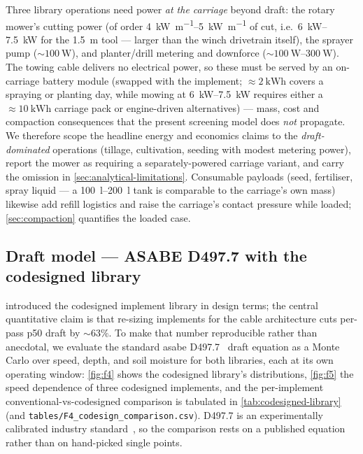 \documentclass[11pt,a4paper]{article}
\begin{document}
Three library operations need power \emph{at the carriage} beyond draft: the rotary mower's cutting power (of order \SIrange{4}{5}{\kilo\watt\per\meter} of cut, i.e.\ \SIrange{6}{7.5}{\kilo\watt} for the \SI{1.5}{\meter} tool --- larger than the winch drivetrain itself), the sprayer pump (${\sim}\SI{100}{\watt}$), and planter/drill metering and downforce (${\sim}\SIrange{100}{300}{\watt}$). The towing cable delivers no electrical power, so these must be served by an on-carriage battery module (swapped with the implement; ${\approx}\SI{2}{\kWh}$ covers a spraying or planting day, while mowing at \SIrange{6}{7.5}{\kilo\watt} requires either a ${\approx}\SI{10}{\kWh}$ carriage pack or engine-driven alternatives) --- mass, cost and compaction consequences that the present screening model does \emph{not} propagate. We therefore scope the headline energy and economics claims to the \emph{draft-dominated} operations (tillage, cultivation, seeding with modest metering power), report the mower as requiring a separately-powered carriage variant, and carry the omission in \cref{sec:analytical-limitations}. Consumable payloads (seed, fertiliser, spray liquid --- a \SIrange{100}{200}{\litre} tank is comparable to the carriage's own mass) likewise add refill logistics and raise the carriage's contact pressure while loaded; \cref{sec:compaction} quantifies the loaded case.

\subsection{Draft model --- ASABE D497.7 with the codesigned library}\label{sec:soil}

 introduced the codesigned implement library in design terms; the central quantitative claim is that re-sizing implements for the cable architecture cuts per-pass \gls{p50} draft by ${\sim}\!63\%$. To make that number reproducible rather than anecdotal, we evaluate the standard \gls{asabe} D497.7~\cite{asabe-d497} draft equation as a Monte Carlo over speed, depth, and soil moisture for both libraries, each at its own operating window: \cref{fig:f4} shows the codesigned library's distributions, \cref{fig:f5} the speed dependence of three codesigned implements, and the per-implement conventional-vs-codesigned comparison is tabulated in \cref{tab:codesigned-library} (and \texttt{tables/F4\_codesign\_comparison.csv}). D497.7 is an experimentally calibrated industry standard~\cite{asabe-d497,kheiralla2004tillage}, so the comparison rests on a published equation rather than on hand-picked single points.
\end{document}
